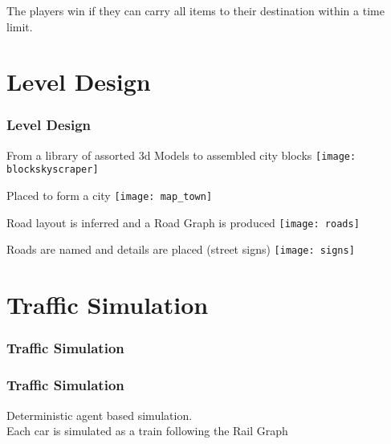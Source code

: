 \documentclass{beamer}
\begin{document}
\begin{frame}
The players win if they can carry all items to their destination within a time limit.
\end{frame}

\section{Level Design}

\begin{frame}
\frametitle{Level Design}
\end{frame}

\begin{frame}
	\begin{center}
	From a library of assorted 3d Models to assembled city blocks
	\texttt{[image: blockskyscraper]}
	\end{center}
\end{frame}

\begin{frame}
	\begin{center}
	Placed to form a city
	\texttt{[image: map\_town]}
	\end{center}
\end{frame}

\begin{frame}
	\begin{center}
	Road layout is inferred and a Road Graph is produced
	\texttt{[image: roads]}
	\end{center}
\end{frame}

\begin{frame}
	\begin{center}
	Roads are named and details are placed (street signs)
	\texttt{[image: signs]}
	\end{center}
\end{frame}

\section{Traffic Simulation}

\begin{frame}
\frametitle{Traffic Simulation}
\end{frame}

\begin{frame}
	\frametitle{Traffic Simulation}
	Deterministic agent based simulation. \\
	Each car is simulated as a train following the Rail Graph
\end{frame}
\end{document}
